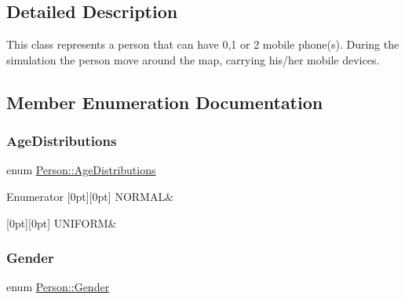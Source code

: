 \subsection{Detailed Description}
This class represents a person that can have 0,1 or 2 mobile phone(s). During the simulation the person move around the map, carrying his/her mobile devices. 

\subsection{Member Enumeration Documentation}
\mbox{\label{class_person_a53376a9a5852ec7760488a01c37f0b0b}} 
\subsubsection{\texorpdfstring{AgeDistributions}{AgeDistributions}}
{\footnotesize\ttfamily enum \mbox{\hyperlink{class_person_a53376a9a5852ec7760488a01c37f0b0b}{Person\+::\+Age\+Distributions}}}

\begin{DoxyEnumFields}{Enumerator}
[0pt][0pt]{}\mbox{\label{class_person_a53376a9a5852ec7760488a01c37f0b0ba7e4e1da74c9858476e0149deef9458c4}} 
N\+O\+R\+M\+AL&\\
\hline

[0pt][0pt]{}\mbox{\label{class_person_a53376a9a5852ec7760488a01c37f0b0ba4cf35976a167c4ac001a3eed2920a9b0}} 
U\+N\+I\+F\+O\+RM&\\
\hline

\end{DoxyEnumFields}
\mbox{\label{class_person_aff84ca16bd4dbf364614d86f20b29dd2}} 
\subsubsection{\texorpdfstring{Gender}{Gender}}
{\footnotesize\ttfamily enum \mbox{\hyperlink{class_person_aff84ca16bd4dbf364614d86f20b29dd2}{Person\+::\+Gender}}}

